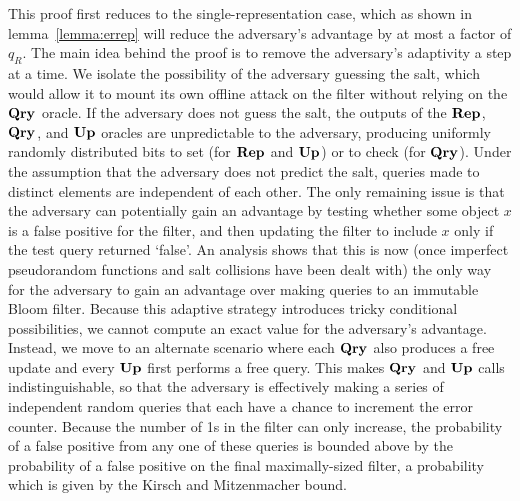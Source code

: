 This proof first reduces to the single-representation case, which as shown in
lemma~\ref{lemma:errep} will reduce the adversary's advantage by at most a
factor of $q_R$. The main idea behind the proof is to remove the adversary's
adaptivity a step at a time. We isolate the possibility of the adversary
guessing the salt, which would allow it to mount its own offline attack on the
filter without relying on the $\mathbf{Qry}\hspace{0.5pt}$ oracle. If the adversary does not guess
the salt, the outputs of the $\mathbf{Rep}\hspace{0.5pt}$, $\mathbf{Qry}\hspace{0.5pt}$, and $\mathbf{Up}\hspace{0.5pt}$ oracles are
unpredictable to the adversary, producing uniformly randomly distributed bits to
set (for $\mathbf{Rep}\hspace{0.5pt}$ and $\mathbf{Up}\hspace{0.5pt}$) or to check (for $\mathbf{Qry}\hspace{0.5pt}$). Under the assumption
that the adversary does not predict the salt, queries made to distinct elements
are independent of each other. The only remaining issue is that the adversary
can potentially gain an advantage by testing whether some object $x$ is a false
positive for the filter, and then updating the filter to include $x$ only if the
test query returned `false'. An analysis shows that this is now (once imperfect
pseudorandom functions and salt collisions have been dealt with) the only way
for the adversary to gain an advantage over making queries to an immutable Bloom
filter. Because this adaptive strategy introduces tricky conditional
possibilities, we cannot compute an exact value for the adversary's advantage.
Instead, we move to an alternate scenario where each $\mathbf{Qry}\hspace{0.5pt}$ also produces a
free update and every $\mathbf{Up}\hspace{0.5pt}$ first performs a free query. This makes $\mathbf{Qry}\hspace{0.5pt}$ and
$\mathbf{Up}\hspace{0.5pt}$ calls indistinguishable, so that the adversary is effectively making a
series of independent random queries that each have a chance to increment the
error counter. Because the number of 1s in the filter can only increase, the
probability of a false positive from any one of these queries is bounded above
by the probability of a false positive on the final maximally-sized filter, a
probability which is given by the Kirsch and Mitzenmacher bound.

